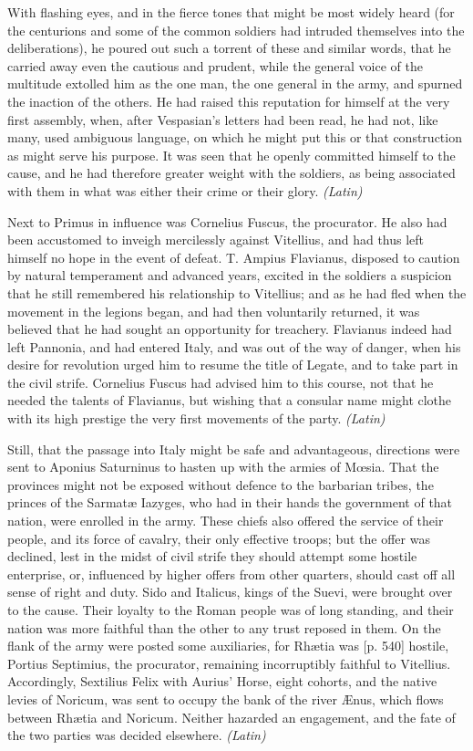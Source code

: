 With flashing eyes, and in the fierce tones that might be most widely heard (for the centurions and some of the common soldiers had intruded themselves into the deliberations), he poured out such a torrent of these and similar words, that he carried away even the cautious and prudent, while the general voice of the multitude extolled him as the one man, the one general in the army, and spurned the inaction of the others. He had raised this reputation for himself at the very first assembly, when, after Vespasian's letters had been read, he had not, like many, used ambiguous language, on which he might put this or that construction as might serve his purpose. It was seen that he openly committed himself to the cause, and he had therefore greater weight with the soldiers, as being associated with them in what was either their crime or their glory. \emph{(Latin)}


Next to Primus in influence was Cornelius Fuscus, the procurator. He also had been accustomed to inveigh mercilessly against Vitellius, and had thus left himself no hope in the event of defeat. T. Ampius Flavianus, disposed to caution by natural temperament and advanced years, excited in the soldiers a suspicion that he still remembered his relationship to Vitellius; and as he had fled when the movement in the legions began, and had then voluntarily returned, it was believed that he had sought an opportunity for treachery. Flavianus indeed had left Pannonia, and had entered Italy, and was out of the way of danger, when his desire for revolution urged him to resume the title of Legate, and to take part in the civil strife. Cornelius Fuscus had advised him to this course, not that he needed the talents of Flavianus, but wishing that a consular name might clothe with its high prestige the very first movements of the party. \emph{(Latin)}


Still, that the passage into Italy might be safe and advantageous, directions were sent to Aponius Saturninus to hasten up with the armies of Mœsia. That the provinces might not be exposed without defence to the barbarian tribes, the princes of the Sarmatæ Iazyges, who had in their hands the government of that nation, were enrolled in the army. These chiefs also offered the service of their people, and its force of cavalry, their only effective troops; but the offer was declined, lest in the midst of civil strife they should attempt some hostile enterprise, or, influenced by higher offers from other quarters, should cast off all sense of right and duty. Sido and Italicus, kings of the Suevi, were brought over to the cause. Their loyalty to the Roman people was of long standing, and their nation was more faithful than the other to any trust reposed in them. On the flank of the army were posted some auxiliaries, for Rhætia was [p. 540] hostile, Portius Septimius, the procurator, remaining incorruptibly faithful to Vitellius. Accordingly, Sextilius Felix with Aurius' Horse, eight cohorts, and the native levies of Noricum, was sent to occupy the bank of the river Ænus, which flows between Rhætia and Noricum. Neither hazarded an engagement, and the fate of the two parties was decided elsewhere. \emph{(Latin)}

